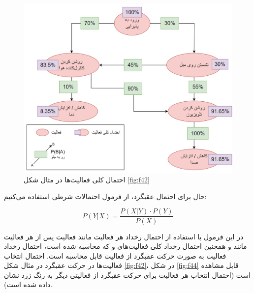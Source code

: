 \begin{figure}[htp]
\centerline{\includegraphics[width=1\textwidth]{figs/f42b.png}}
\caption{احتمال کلی فعالیت‌ها در مثال شکل \ref{fig:f42}}
\label{fig:f42b}
\end{figure}

حال برای احتمال عقبگرد، از فرمول احتمالات شرطی استفاده می‌کنیم:

\begin{equation}
P(Y|X) = \frac{P(X|Y) \cdot P(Y)}{P(X)}
\end{equation}

در این فرمول با استفاده از احتمال رخداد هر فعالیت مانند فعالیت  پس از هر فعالیت مانند  و همچنین احتمال رخداد کلی فعالیت‌های  و  که محاسبه شده است، احتمال رخداد فعالیت  به صورت حرکت عقبگرد از فعالیت  قابل محاسبه است. احتمال انتخاب فعالیت‌ها در حرکت عقبگرد در مثال شکل \ref{fig:f42}، در شکل  \ref{fig:f44} قابل مشاهده است (احتمال انتخاب هر فعالیت برای حرکت عقبگرد از فعالیتی دیگر به رنگ زرد نشان داده شده است).

